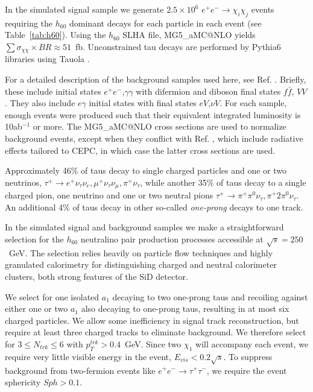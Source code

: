 \documentclass{ws-ijmpa}
\begin{document}
In the simulated signal sample we generate $2.5 \times 10^6$ $e^+ e^- \rightarrow \chi_{i} \chi_{j}$  events requiring the $h_{60}$ dominant decays for each particle in each event (see Table~\ref{tab:h60}). Using the $h_{60}$ SLHA \cite{Skands:2003cj} file, MG5\_aMC@NLO yields $\sum \sigma_{\chi \chi} \times BR \approx 51$~fb. Unconstrained tau decays are performed by Pythia6 \cite{Sjostrand:2006za} libraries using Tauola \cite{Was:2011tv}. 

For a detailed description of the background samples used here, see Ref. . Briefly, these include initial states $e^+ e^-$,$\gamma \gamma$ with difermion and diboson final states $f\bar{f}$, $VV$. They also include $e \gamma$ initial states with final states $eV$,$\nu V$. For each sample, enough events were produced such that their equivalent integrated luminosity is 10ab$^{-1}$ or more. The MG5\_aMC@NLO cross sections are used to normalize background events, except when they conflict with Ref. , which include radiative effects tailored to CEPC, in which case the latter cross sections are used.

Approximately 46\% of taus decay to single charged particles and one or two neutrinos, $\tau^+ \rightarrow e^+ \nu_{\tau} \nu_{e}, \mu^+ \nu_{\tau} \nu_{\mu}, \pi^+ \nu_{\tau}$, while another 35\% of taus decay to a single charged pion, one neutrino and one or two neutral pions $\tau^+ \rightarrow \pi^+ \pi^0 \nu_{\tau}, \pi^+ 2\pi^0 \nu_{\tau}$. An additional 4\% of taus decay in other so-called \emph{one-prong} decays to one track.

In the simulated signal and background samples we make a straightforward selection for the $h_{60}$ neutralino  pair production processes accessible at $\sqrt{s}=250$~GeV. The selection relies heavily on particle flow techniques and highly granulated calorimetry for distinguishing charged and neutral calorimeter clusters, both strong features of the SiD detector.

We select for one isolated $a_1$ decaying to two one-prong taus and recoiling against either one or two $a_1$ also decaying to one-prong taus, resulting in at most six charged particles. We allow some inefficiency in signal track reconstruction, but require at least three charged tracks to eliminate background. We therefore select for $3 \leq N_{trk} \leq 6$ with $p_{T}^{trk}>0.4$~GeV. Since two $\chi_1$ will accompany each event, we require very little visible energy in the event, $E_{vis}<0.2 \sqrt{s}$. To suppress background from two-fermion events like $e^+ e^- \rightarrow \tau^+ \tau^-$, we require the event sphericity $Sph>0.1$. 
\end{document}

